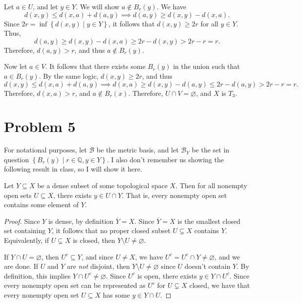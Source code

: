 \documentclass[11pt, letterpaper]{article}
\begin{document}
\begin{itemize}
		Let $a\in U$, and let $y\in Y$. We will show $a\notin B_r(y)$. We have
		\[
			d(x,y)\leq d(x,a)+d(a,y)\implies d(a,y)\geq d(x,y)-d(x,a)
		.\]
		Since $2r=\inf \left\{ d(x,y)\mid y\in Y \right\} $, it follows that $d(x,y)\geq 2r$ for all $y\in Y$. Thus,
		\[
			d(a,y)\geq d(x,y)-d(x,a)\geq 2r-d(x,y)>2r-r=r
		.\]
		Therefore, $d(a,y)>r$, and thus $a\notin B_r(y)$.

		Now let $a\in V$. It follows that there exists some $B_r(y)$ in the union such that $a\in B_r(y)$. By the same logic, $d(x,y)\geq 2r$, and thus
		\[
			d(x,y)\leq d(x,a)+d(a,y)\implies d(x,a)\geq d(x,y)-d(a,y)\leq 2r-d(a,y)>2r-r=r
		.\]
		Therefore, $d(x,a)>r$, and $a\notin B_r(x)$. Therefore, $U \cap V=\varnothing $, and $X$ is $T_3$.
\end{itemize}

\section*{Problem 5}
For notational purposes, let $\mathcal{B}$ be the metric basis, and let $\mathcal{B}_Y$ be the set in question $\left\{ B_r(y)\mid r\in\mathbb{Q} ,y\in Y \right\} $. I also don't remember us showing the following result in class, so I will show it here.
\begin{lemma}\label{lma:1}
	Let $Y\subseteq X$ be a dense subset of some topological space $X$. Then for all nonempty open sets $U\subseteq X$, there exists $y\in U \cap Y$. That is, every nonempty open set contains some element of $Y$.
\end{lemma}
\begin{proof}
	Since $Y$ is dense, by definition $\overline{Y} =X$. Since $\overline{Y} =X$ is the smallest closed set containing $Y$, it follows that no proper closed subset $U\subsetneq X$ contains $Y$. Equivalently, if $U\subsetneq X$ is closed, then $Y\setminus U\neq \varnothing $.

	If $Y \cap U=\varnothing $, then $U^{c} \subseteq Y$, and since $U\neq X$, we have $U^{c} =U^{c} \cap Y\neq \varnothing $, and we are done. If $U$ and $Y$ are \emph{not} disjoint, then $Y\setminus U\neq \varnothing $ since $U$ doesn't contain $Y$. By definition, this implies $Y \cap U^{c} \neq \varnothing $. Since $U^{c} $ is open, there exists $y\in Y \cap U^{c} $. Since every nonempty open set can be represented as $U^{c} $ for $U\subsetneq X$ closed, we have that every nonempty open set $U\subseteq X$ has some $y\in Y \cap U$.
\end{proof}
\end{document}
